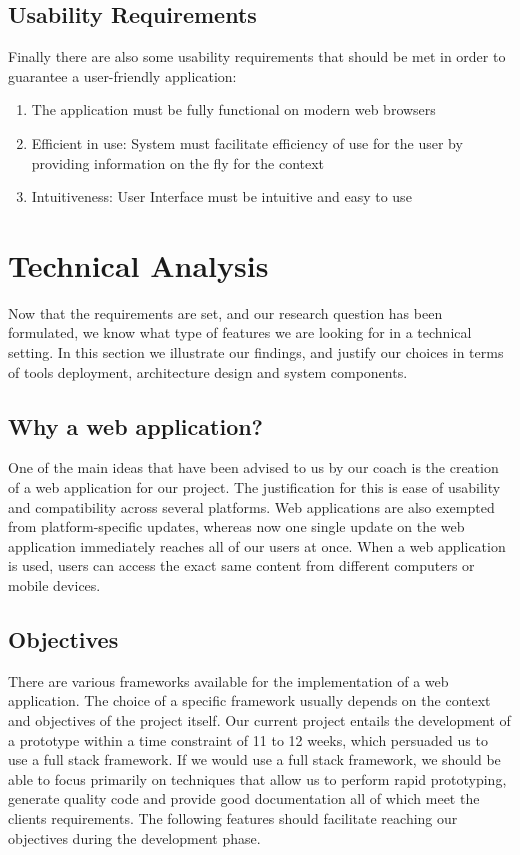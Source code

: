 \subsection{Usability Requirements} %

Finally there are also some usability requirements that should be met in order to guarantee a user-friendly application:

\label{sub:usability_requirements}
\begin{enumerate}
	\item The application must be fully functional on modern web browsers
	\item Efficient in use: System must facilitate efficiency of use for the user by providing information on the fly for the context
	\item Intuitiveness: User Interface must be intuitive and easy to use
\end{enumerate}
\newpage
\section{Technical Analysis} %

Now that the requirements are set, and our research question has been formulated, we know what type of features we are looking for in a technical setting. In this section we illustrate our findings, and justify our choices in terms of tools deployment, architecture design and system components.

\subsection{Why a web application?}
One of the main ideas that have been advised to us by our coach is the creation of a web application for our project. The justification for this is ease of usability and compatibility across several platforms. Web applications are also exempted from platform-specific updates, whereas now one single update on the web application immediately reaches all of our users at once. When a web application is used, users can access the exact same content from different computers or mobile devices.
\subsection{Objectives}
There are various frameworks available for the implementation of a web application. The choice of a specific framework usually depends on the context and objectives of the project itself. Our current project entails the development of a prototype within a time constraint of 11 to 12 weeks, which persuaded us to use a full stack framework. If we would use a full stack framework, we should be able to focus primarily on techniques that allow us to perform rapid prototyping, generate quality code and provide good documentation all of which meet the clients requirements. The following features should facilitate reaching our objectives during the development phase.

